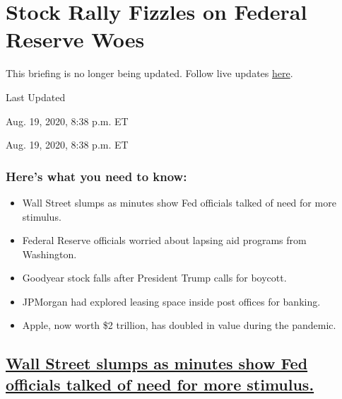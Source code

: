 \hypertarget{stock-rally-fizzles-on-federal-reserve-woes}{%
\section{Stock Rally Fizzles on Federal Reserve
Woes}\label{stock-rally-fizzles-on-federal-reserve-woes}}

This briefing is no longer being updated. Follow live updates
\href{https://www.nytimes3xbfgragh.onion/2020/08/19/world/covid-19-coronavirus.html}{here}.

Last Updated

Aug. 19, 2020, 8:38 p.m. ET

Aug. 19, 2020, 8:38 p.m. ET

\hypertarget{heres-what-you-need-to-know}{%
\subsubsection{Here's what you need to
know:}\label{heres-what-you-need-to-know}}

\begin{itemize}
\item
  \protect\hyperlink{wall-street-slumps-as-minutes-show-fed-officials-talked-of-need-for-more-stimulus}{}

  Wall Street slumps as minutes show Fed officials talked of need for
  more stimulus.
\item
  \protect\hyperlink{federal-reserve-officials-worried-about-lapsing-aid-programs-from-washington}{}

  Federal Reserve officials worried about lapsing aid programs from
  Washington.
\item
  \protect\hyperlink{goodyear-stock-falls-after-president-trump-calls-for-boycott}{}

  Goodyear stock falls after President Trump calls for boycott.
\item
  \protect\hyperlink{jpmorgan-had-explored-leasing-space-inside-post-offices-for-banking}{}

  JPMorgan had explored leasing space inside post offices for banking.
\item
  \protect\hyperlink{apple-now-worth-2-trillion-has-doubled-in-value-during-the-pandemic}{}

  Apple, now worth \$2 trillion, has doubled in value during the
  pandemic.
\end{itemize}

\hypertarget{wall-street-slumps-as-minutes-show-fed-officials-talked-of-need-for-more-stimulus}{%
\subsection{\texorpdfstring{\protect\hyperlink{wall-street-slumps-as-minutes-show-fed-officials-talked-of-need-for-more-stimulus}{Wall
Street slumps as minutes show Fed officials talked of need for more
stimulus.}}{Wall Street slumps as minutes show Fed officials talked of need for more stimulus.}}\label{wall-street-slumps-as-minutes-show-fed-officials-talked-of-need-for-more-stimulus}}

